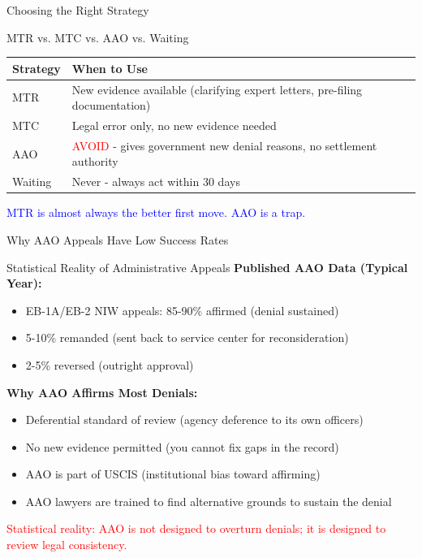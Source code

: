 \documentclass[11pt]{beamer}
\begin{document}
	\begin{frame}{Choosing the Right Strategy}
		\scriptsize
		\begin{block}{MTR vs. MTC vs. AAO vs. Waiting}
			\centering
			\begin{tabular}{|p{4cm}|p{5cm}|}
				\hline
				\textbf{Strategy} & \textbf{When to Use} \\
				\hline
				MTR & New evidence available (clarifying expert letters, pre-filing documentation) \\
				\hline
				MTC & Legal error only, no new evidence needed \\
				\hline
				AAO & \textcolor{red}{AVOID} - gives government new denial reasons, no settlement authority \\
				\hline
				Waiting & Never - always act within 30 days \\
				\hline
			\end{tabular}
			\vspace{0.2cm}
			\textcolor{blue}{MTR is almost always the better first move. AAO is a trap.}
		\end{block}
	\end{frame}
	
	
	\begin{frame}{Why AAO Appeals Have Low Success Rates}
		\scriptsize
		\begin{block}{Statistical Reality of Administrative Appeals}
			\textbf{Published AAO Data (Typical Year):}
			\begin{itemize}
				\item EB-1A/EB-2 NIW appeals: 85-90\% affirmed (denial sustained)
				\item 5-10\% remanded (sent back to service center for reconsideration)
				\item 2-5\% reversed (outright approval)
			\end{itemize}
			\textbf{Why AAO Affirms Most Denials:}
			\begin{itemize}
				\item Deferential standard of review (agency deference to its own officers)
				\item No new evidence permitted (you cannot fix gaps in the record)
				\item AAO is part of USCIS (institutional bias toward affirming)
				\item AAO lawyers are trained to find alternative grounds to sustain the denial
			\end{itemize}
			\textcolor{red}{Statistical reality: AAO is not designed to overturn denials; it is designed to review legal consistency.}
		\end{block}
	\end{frame}
	
\end{document}
